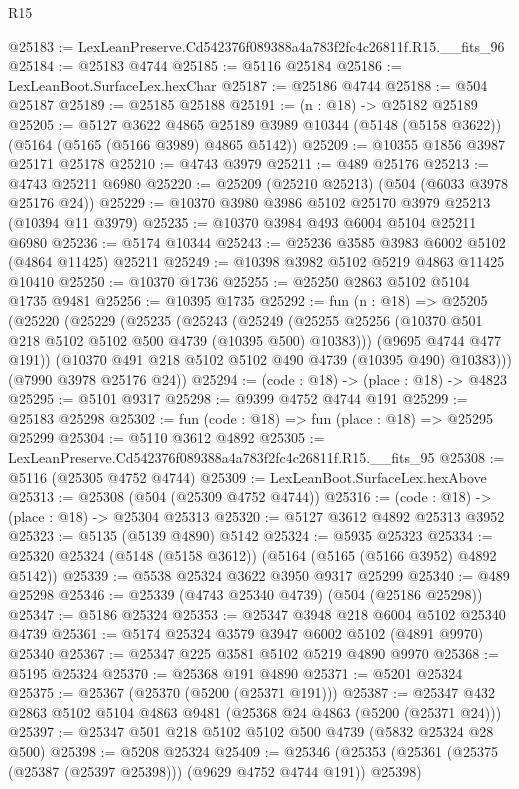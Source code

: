 \begin{lexlean}{R15}
\begin{coremodule}
{{{{{{{{{{{@25183 := LexLeanPreserve.Cd542376f089388a4a783f2fc4c26811f.R15.__fits_96
@25184 := @25183 @4744
@25185 := @5116 @25184
@25186 := LexLeanBoot.SurfaceLex.hexChar
@25187 := @25186 @4744
@25188 := @504 @25187
@25189 := @25185 @25188
@25191 := (n : @18) -> @25182 @25189
@25205 := @5127
    @3622
    @4865
    @25189
    @3989
    @10344
    (@5148 (@5158 @3622))
    (@5164 (@5165 (@5166 @3989) @4865 @5142))
@25209 := @10355 @1856 @3987 @25171 @25178
@25210 := @4743 @3979
@25211 := @489 @25176
@25213 := @4743 @25211 @6980
@25220 := @25209 (@25210 @25213) (@504 (@6033 @3978 @25176 @24))
@25229 := @10370 @3980 @3986 @5102 @25170 @3979 @25213 (@10394 @11 @3979)
@25235 := @10370 @3984 @493 @6004 @5104 @25211 @6980
@25236 := @5174 @10344
@25243 := @25236 @3585 @3983 @6002 @5102 (@4864 @11425) @25211
@25249 := @10398 @3982 @5102 @5219 @4863 @11425 @10410
@25250 := @10370 @1736
@25255 := @25250 @2863 @5102 @5104 @1735 @9481
@25256 := @10395 @1735
@25292 := fun (n : @18) =>
  @25205
    (@25220
      (@25229
        (@25235
          (@25243
            (@25249 (@25255 @25256 (@10370 @501 @218 @5102 @5102 @500 @4739 (@10395 @500) @10383)))
            (@9695 @4744 @477 @191))
          (@10370 @491 @218 @5102 @5102 @490 @4739 (@10395 @490) @10383)))
      (@7990 @3978 @25176 @24))
@25294 := (code : @18) -> (place : @18) -> @4823
@25295 := @5101 @9317
@25298 := @9399 @4752 @4744 @191
@25299 := @25183 @25298
@25302 := fun (code : @18) => fun (place : @18) => @25295 @25299
@25304 := @5110 @3612 @4892
@25305 := LexLeanPreserve.Cd542376f089388a4a783f2fc4c26811f.R15.__fits_95
@25308 := @5116 (@25305 @4752 @4744)
@25309 := LexLeanBoot.SurfaceLex.hexAbove
@25313 := @25308 (@504 (@25309 @4752 @4744))
@25316 := (code : @18) -> (place : @18) -> @25304 @25313
@25320 := @5127 @3612 @4892 @25313 @3952
@25323 := @5135 (@5139 @4890) @5142
@25324 := @5935 @25323
@25334 := @25320 @25324 (@5148 (@5158 @3612)) (@5164 (@5165 (@5166 @3952) @4892 @5142))
@25339 := @5538 @25324 @3622 @3950 @9317 @25299
@25340 := @489 @25298
@25346 := @25339 (@4743 @25340 @4739) (@504 (@25186 @25298))
@25347 := @5186 @25324
@25353 := @25347 @3948 @218 @6004 @5102 @25340 @4739
@25361 := @5174 @25324 @3579 @3947 @6002 @5102 (@4891 @9970) @25340
@25367 := @25347 @225 @3581 @5102 @5219 @4890 @9970
@25368 := @5195 @25324
@25370 := @25368 @191 @4890
@25371 := @5201 @25324
@25375 := @25367 (@25370 (@5200 (@25371 @191)))
@25387 := @25347 @432 @2863 @5102 @5104 @4863 @9481 (@25368 @24 @4863 (@5200 (@25371 @24)))
@25397 := @25347 @501 @218 @5102 @5102 @500 @4739 (@5832 @25324 @28 @500)
@25398 := @5208 @25324
@25409 := @25346 (@25353 (@25361 (@25375 (@25387 (@25397 @25398))) (@9629 @4752 @4744 @191)) @25398)
}}}}}}}}}}}
\end{coremodule}
\end{lexlean}

